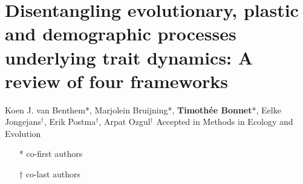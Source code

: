 


\chapter[\texorpdfstring{Chapter 3 \\Disentangling evolutionary, plastic and demographic processes underlying trait dynamics: A review of four frameworks}{Chapter 3 -- Disentangling evolutionary, plastic and demographic processes underlying trait dynamics: A review of four frameworks}]{Disentangling evolutionary, plastic and demographic processes underlying trait dynamics: A review of four frameworks}
\label{chap:decpop}

Koen J. van Benthem*, Marjolein Bruijning*, \textbf{Timoth\'ee Bonnet}*, Eelke Jongejans$^\dagger$,
Erik Postma$^\dagger$, Arpat Ozgul$^\dagger$ Accepted in Methods in Ecology and Evolution
\begin{itemize}
\item[*] co-first authors
\item[$\dagger$] co-last authors
\end{itemize}

